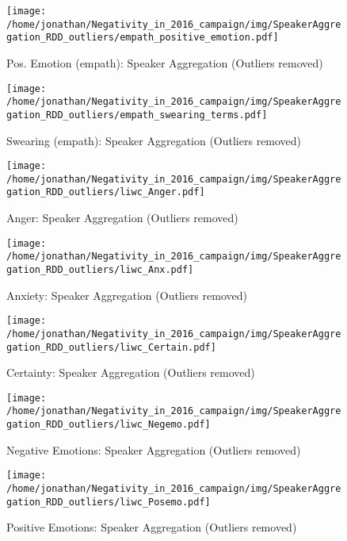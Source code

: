 \begin{figure}[h]\centering
\texttt{[image: /home/jonathan/Negativity\_in\_2016\_campaign/img/SpeakerAggregation\_RDD\_outliers/empath\_positive\_emotion.pdf]}
\caption{Pos. Emotion (empath): Speaker Aggregation (Outliers removed)}
\label{fig: sa_Pos. Emotion (empath)}
\end
{figure}

\begin{figure}[h]\centering
\texttt{[image: /home/jonathan/Negativity\_in\_2016\_campaign/img/SpeakerAggregation\_RDD\_outliers/empath\_swearing\_terms.pdf]}
\caption{Swearing (empath): Speaker Aggregation (Outliers removed)}
\label{fig: sa_Swearing (empath)}
\end
{figure}

\begin{figure}[h]\centering
\texttt{[image: /home/jonathan/Negativity\_in\_2016\_campaign/img/SpeakerAggregation\_RDD\_outliers/liwc\_Anger.pdf]}
\caption{Anger: Speaker Aggregation (Outliers removed)}
\label{fig: sa_Anger}
\end
{figure}

\begin{figure}[h]\centering
\texttt{[image: /home/jonathan/Negativity\_in\_2016\_campaign/img/SpeakerAggregation\_RDD\_outliers/liwc\_Anx.pdf]}
\caption{Anxiety: Speaker Aggregation (Outliers removed)}
\label{fig: sa_Anxiety}
\end
{figure}

\begin{figure}[h]\centering
\texttt{[image: /home/jonathan/Negativity\_in\_2016\_campaign/img/SpeakerAggregation\_RDD\_outliers/liwc\_Certain.pdf]}
\caption{Certainty: Speaker Aggregation (Outliers removed)}
\label{fig: sa_Certainty}
\end
{figure}

\begin{figure}[h]\centering
\texttt{[image: /home/jonathan/Negativity\_in\_2016\_campaign/img/SpeakerAggregation\_RDD\_outliers/liwc\_Negemo.pdf]}
\caption{Negative Emotions: Speaker Aggregation (Outliers removed)}
\label{fig: sa_Negative Emotions}
\end
{figure}

\begin{figure}[h]\centering
\texttt{[image: /home/jonathan/Negativity\_in\_2016\_campaign/img/SpeakerAggregation\_RDD\_outliers/liwc\_Posemo.pdf]}
\caption{Positive Emotions: Speaker Aggregation (Outliers removed)}
\label{fig: sa_Positive Emotions}
\end
{figure}

